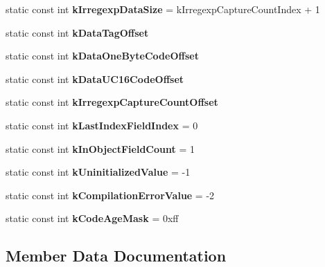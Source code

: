 \begin{DoxyCompactItemize}
\item 
static const int {\bfseries k\+Irregexp\+Data\+Size} = k\+Irregexp\+Capture\+Count\+Index + 1\hypertarget{classv8_1_1internal_1_1_j_s_reg_exp_ab5b2b03b911c494d666b474d4e686233}{}\label{classv8_1_1internal_1_1_j_s_reg_exp_ab5b2b03b911c494d666b474d4e686233}

\item 
static const int {\bfseries k\+Data\+Tag\+Offset}
\item 
static const int {\bfseries k\+Data\+One\+Byte\+Code\+Offset}
\item 
static const int {\bfseries k\+Data\+U\+C16\+Code\+Offset}
\item 
static const int {\bfseries k\+Irregexp\+Capture\+Count\+Offset}
\item 
static const int {\bfseries k\+Last\+Index\+Field\+Index} = 0\hypertarget{classv8_1_1internal_1_1_j_s_reg_exp_acbd49fd9b1fd11429c5e34bdfa8075a4}{}\label{classv8_1_1internal_1_1_j_s_reg_exp_acbd49fd9b1fd11429c5e34bdfa8075a4}

\item 
static const int {\bfseries k\+In\+Object\+Field\+Count} = 1\hypertarget{classv8_1_1internal_1_1_j_s_reg_exp_aa2a8207a8ea8c66ba8aaa6b55c5f0f92}{}\label{classv8_1_1internal_1_1_j_s_reg_exp_aa2a8207a8ea8c66ba8aaa6b55c5f0f92}

\item 
static const int {\bfseries k\+Uninitialized\+Value} = -\/1\hypertarget{classv8_1_1internal_1_1_j_s_reg_exp_a0b4c665fbb52801f03a418dda10b8891}{}\label{classv8_1_1internal_1_1_j_s_reg_exp_a0b4c665fbb52801f03a418dda10b8891}

\item 
static const int {\bfseries k\+Compilation\+Error\+Value} = -\/2\hypertarget{classv8_1_1internal_1_1_j_s_reg_exp_a1eedcec275d583051a7904e68adf12b2}{}\label{classv8_1_1internal_1_1_j_s_reg_exp_a1eedcec275d583051a7904e68adf12b2}

\item 
static const int {\bfseries k\+Code\+Age\+Mask} = 0xff\hypertarget{classv8_1_1internal_1_1_j_s_reg_exp_ae6261c435a2c70c96ab1ba11a6b5d51b}{}\label{classv8_1_1internal_1_1_j_s_reg_exp_ae6261c435a2c70c96ab1ba11a6b5d51b}

\end{DoxyCompactItemize}


\subsection{Member Data Documentation}
